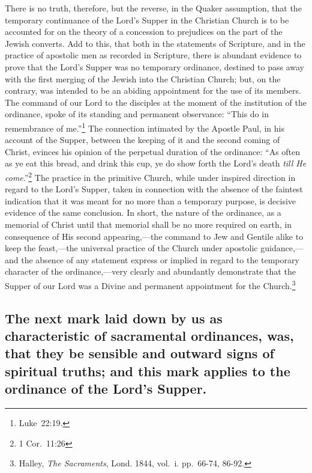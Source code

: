 \documentclass[english,]{book}
\begin{document}
There is no truth, therefore, but the reverse, in the Quaker assumption, that the temporary continuance of the Lord's Supper in the Christian Church is to be accounted for on the theory of a concession to prejudices on the part of the Jewish converts. Add to this, that both in the statements of Scripture, and in the practice of apostolic men as recorded in Scripture, there is abundant evidence to prove that the Lord's Supper was no temporary ordinance, destined to pass away with the first merging of the Jewish into the Christian Church; but, on the contrary, was intended to be an abiding appointment for the use of its members. The command of our Lord to the disciples at the moment of the institution of the ordinance, spoke of its standing and permanent observance: ``This do in remembrance of me.''\footnote{Luke~22:19.} The connection intimated by the Apostle Paul, in his account of the Supper, between the keeping of it and the second coming of Christ, evinces his opinion of the perpetual duration of the ordinance: ``As often as ye eat this bread, and drink this cup, ye do show forth the Lord's death \emph{till He come}.''\footnote{1 Cor.~11:26} The practice in the primitive Church, while under inspired direction in regard to the Lord's Supper, taken in connection with the absence of the faintest indication that it was meant for no more than a temporary purpose, is decisive evidence of the same conclusion. In short, the nature of the ordinance, as a memorial of Christ until that memorial shall be no more required on earth, in consequence of His second appearing,---the command to Jew and Gentile alike to keep the feast,---the universal practice of the Church under apostolic guidance,---and the absence of any statement express or implied in regard to the temporary character of the ordinance,---very clearly and abundantly demonstrate that the Supper of our Lord was a Divine and permanent appointment for the Church.\footnote{Halley, \emph{The Sacraments}, Lond. 1844, vol.~i. pp.~66-74, 86-92.}

\hypertarget{the-next-mark-laid-down-by-us-as-characteristic-of-sacramental-ordinances-was-that-they-be-sensible-and-outward-signs-of-spiritual-truths-and-this-mark-applies-to-the-ordinance-of-the-lords-supper.}{%
\subsection{The next mark laid down by us as characteristic of sacramental ordinances, was, that they be sensible and outward signs of spiritual truths; and this mark applies to the ordinance of the Lord's Supper.}\label{the-next-mark-laid-down-by-us-as-characteristic-of-sacramental-ordinances-was-that-they-be-sensible-and-outward-signs-of-spiritual-truths-and-this-mark-applies-to-the-ordinance-of-the-lords-supper.}}
\end{document}
